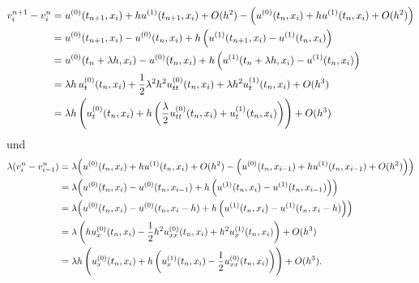 \begin{align} \label{eq:varadv:regular:diff1}
v^{n+1}_i - v^n_i
&= u^{(0)}(t_{n+1}, x_i) + h u^{(1)}(t_{n+1}, x_i) + O(h^2) - \left( u^{(0)}(t_n, x_i) + h u^{(1)}(t_n, x_i) + O(h^2)\right)\notag\\
&= u^{(0)}(t_{n+1}, x_i) - u^{(0)}(t_n, x_i) + h \left( u^{(1)}(t_{n+1}, x_i) - u^{(1)}(t_n, x_i)\right)\notag\\
&= u^{(0)}(t_n + \lambda h, x_i) - u^{(0)}(t_n, x_i) + h \left( u^{(1)}(t_n + \lambda h, x_i) - u^{(1)}(t_n, x_i)\right)\notag\\
&= \lambda h \, u^{(0)}_t (t_n, x_i) + \frac 12 \lambda^2 h^2 u^{(0)}_{tt}(t_n, x_i) + \lambda h^2 u^{(1)}_t(t_n, x_i) + O(h^3)\notag\\
&= \lambda h\, \Biggl( u^{(0)}_t (t_n, x_i) + h \left( \frac \lambda 2 u^{(0)}_{tt}(t_n, x_i) + u^{(1)}_t(t_n, x_i) \right) \Biggr) + O(h^3) 
\end{align}
und
{\small\begin{align} \label{eq:varadv:regular:diff2}
\lambda (v^n_{i} - v^n_{i-1})
&= \lambda \Bigl( u^{(0)}(t_n, x_i) + h u^{(1)}(t_n, x_i) + O(h^2) - \left( u^{(0)}(t_n, x_{i-1}) + h u^{(1)}(t_n, x_{i-1}) + O(h^2) \right) \Bigr)\notag\\
&= \lambda \Bigl( u^{(0)}(t_n, x_i) - u^{(0)}(t_n, x_{i-1}) + h \left( u^{(1)}(t_n, x_i) - u^{(1)}(t_n, x_{i-1}) \right) \Bigr) \notag\\
&= \lambda \Bigl( u^{(0)}(t_n, x_i) - u^{(0)}(t_n, x_i-h) + h \left( u^{(1)}(t_n, x_i) - u^{(1)}(t_n, x_i-h) \right) \Bigr)\notag\\
&= \lambda \left( h u^{(0)}_x(t_n, x_i) - \frac 12 h^2 u^{(0)}_{xx}(t_n, x_i) + h^2 u^{(1)}_x(t_n, x_i) \right) + O(h^3)\notag\\
&= \lambda h \,\Biggl( u^{(0)}_x(t_n, x_i) + h \left( u^{(1)}_x(t_n, x_i) - \frac 12 u^{(0)}_{xx}(t_n, x_i) \right) \Biggr) + O(h^3).
\end{align}}

